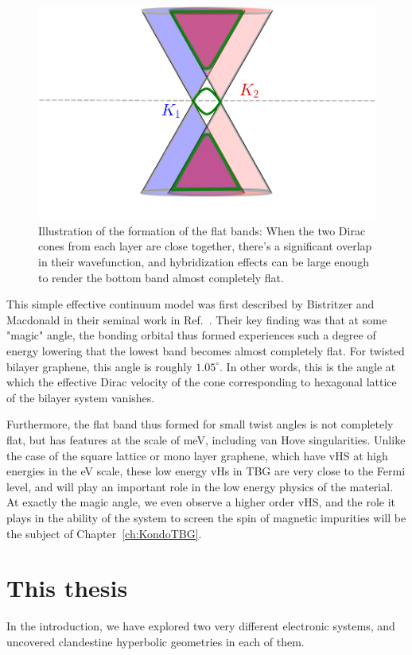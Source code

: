 \begin{figure}[!ht]
    \centering
    \includegraphics[width=0.5\linewidth]{figures/introduction/BandFlattening.pdf}
    \caption{Illustration of the formation of the flat bands: When the two Dirac cones from each layer are close together, there's a significant overlap in their wavefunction, and hybridization effects can be large enough to render the bottom band almost completely flat.}
    \label{fig:bandflattening}
\end{figure}
\par
This simple effective continuum model was first described by Bistritzer and Macdonald in their seminal work in Ref.~\cite{Bistritzer2011}. Their key finding was that at some "magic" angle, the bonding orbital thus formed experiences such a degree of energy lowering that the lowest band becomes almost completely flat. For twisted bilayer graphene, this angle is roughly $1.05^\circ$. In other words, this is the angle at which the effective Dirac velocity of the cone corresponding to hexagonal lattice of the bilayer system vanishes. 
\par
Furthermore, the flat band thus formed for small twist angles is not completely flat, but has features at the scale of meV, including van Hove singularities. Unlike the case of the square lattice or mono layer graphene, which have vHS at high energies in the eV scale, these low energy vHs in TBG are very close to the Fermi level, and will play an important role in the low energy physics of the material. At exactly the magic angle, we even observe a higher order vHS, and the role it plays in the ability of the system to screen the spin of magnetic impurities will be the subject of Chapter~\ref{ch:KondoTBG}.

















\section{This thesis}
In the introduction, we have explored two very different electronic systems, and uncovered clandestine hyperbolic geometries in each of them.  

